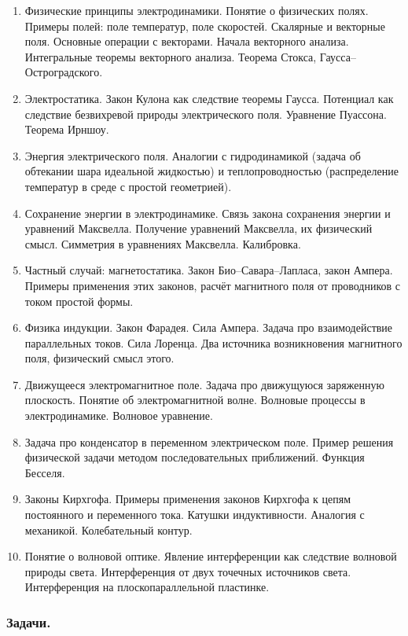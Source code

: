 \documentclass[12pt,a4paper,oneside]{scrartcl}
\begin{document}
\begin{enumerate}
\item Физические принципы электродинамики. Понятие о физических
  полях. Примеры полей: поле температур, поле скоростей. Скалярные и
  векторные поля. Основные операции с векторами. Начала векторного
  анализа. Интегральные теоремы векторного анализа. Теорема Стокса,
  Гаусса–Остроградского.
\item Электростатика. Закон Кулона как следствие теоремы
  Гаусса. Потенциал как следствие безвихревой природы электрического
  поля. Уравнение Пуассона. Теорема Ирншоу.
\item Энергия электрического поля. Аналогии с гидродинамикой (задача
  об обтекании шара идеальной жидкостью) и теплопроводностью
  (распределение температур в среде с простой геометрией).
\item Сохранение энергии в электродинамике. Связь закона сохранения
  энергии и уравнений Максвелла. Получение уравнений Максвелла, их
  физический смысл. Симметрия в уравнениях Максвелла. Калибровка.
\item Частный случай: магнетостатика. Закон Био–Савара–Лапласа, закон
  Ампера. Примеры применения этих законов, расчёт магнитного поля от
  проводников с током простой формы.
\item Физика индукции. Закон Фарадея. Сила Ампера. Задача про
  взаимодействие параллельных токов. Сила Лоренца. Два источника
  возникновения магнитного поля, физический смысл этого.
\item Движущееся электромагнитное поле. Задача про движущуюся
  заряженную плоскость. Понятие об электромагнитной волне. Волновые
  процессы в электродинамике. Волновое уравнение.
\item Задача про конденсатор в переменном электрическом поле. Пример
  решения физической задачи методом последовательных
  приближений. Функция Бесселя.
\item Законы Кирхгофа. Примеры применения законов Кирхгофа к цепям
  постоянного и переменного тока. Катушки индуктивности. Аналогия с
  механикой. Колебательный контур.
\item Понятие о волновой оптике. Явление интерференции как следствие
  волновой природы света. Интерференция от двух точечных источников
  света. Интерференция на плоскопараллельной пластинке.
\end{enumerate}

\subsubsection{Задачи.}
\label{sec:daily_11_problems}
\end{document}
